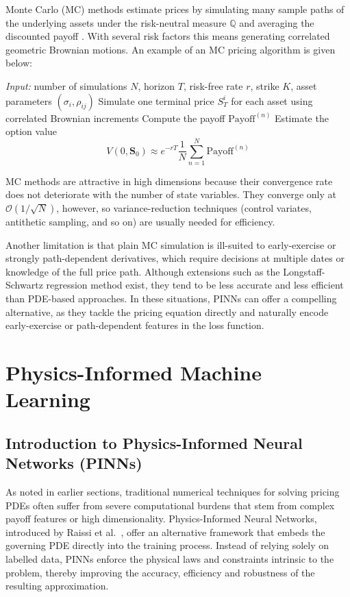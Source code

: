 \documentclass[12pt]{report} %
\theoremstyle{plain} %
\theoremstyle{definition} %
\theoremstyle{remark} %
\begin{document}
Monte Carlo (MC) methods estimate prices by simulating many sample paths of the
underlying assets under the risk-neutral measure \(\mathbb Q\) and averaging the
discounted payoff \cite{glasserman2004monte}. With several risk factors this
means generating correlated geometric Brownian motions. An example of an MC
pricing algorithm is given below:
\begin{algorithm}[H]
 \caption{MC pricing of a general payoff}
 \begin{algorithmic}[1]
 \STATE \textit{Input:} number of simulations \(N\), horizon \(T\), risk-free
 rate \(r\), strike \(K\), asset parameters
 \((\sigma_i,\rho_{ij})\)
 \STATE Simulate one terminal price \(S_T^{i}\) for each asset
 using correlated Brownian increments
 \STATE Compute the payoff
 \(\text{Payoff}^{(n)}\)
 \ENDFOR
 \STATE Estimate the option value
 \[
 V(0,\mathbf S_0)\approx e^{-rT} 
 \frac1N\sum_{n=1}^{N}\text{Payoff}^{(n)}
 \]
 \end{algorithmic}
\end{algorithm}

MC methods are attractive in high dimensions because their convergence rate
does not deteriorate with the number of state variables. They converge only at
\(\mathcal{O}(1/\sqrt N)\), however, so variance-reduction techniques (control
variates, antithetic sampling, and so on) are usually needed for efficiency.

Another limitation is that plain MC simulation is ill-suited to early-exercise
or strongly path-dependent derivatives, which require decisions at multiple
dates or knowledge of the full price path. Although extensions such as the
Longstaff-Schwartz regression method \cite{longstaffshawrtz} exist, they tend
to be less accurate and less efficient than PDE-based approaches. In these
situations, PINNs can offer a compelling
alternative, as they tackle the pricing equation directly and naturally encode
early-exercise or path-dependent features in the loss function.

\chapter{Physics-Informed Machine Learning}

\section{Introduction to Physics-Informed Neural Networks (PINNs)}
As noted in earlier sections, traditional numerical techniques for solving
pricing PDEs often suffer from severe
computational burdens that stem from complex payoff features or high
dimensionality. Physics-Informed Neural Networks, introduced by Raissi
et al.\ \cite{RAISSI2019686}, offer an alternative framework that embeds the
governing PDE directly into the training process. Instead of relying solely on
labelled data, PINNs enforce the physical laws and constraints intrinsic to the
problem, thereby improving the accuracy, efficiency and robustness of the
resulting approximation.
\end{document}
